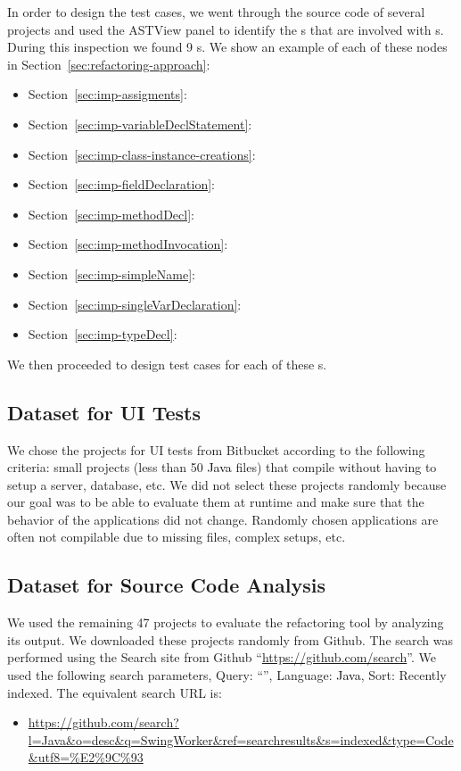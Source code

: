 \documentclass[type=bsc,accentcolor=tud9c]{tudthesis}
\newcommand{\framework}[1]{\textcolor{black}{#1}}
\begin{document}
In order to design the test cases, we went through the source code of several projects and used the ASTView panel to identify the s that are involved with s. During this inspection we found 9 s. We show an example of each of these nodes in Section~\ref{sec:refactoring-approach}:
\begin{itemize}
	\item Section~\ref{sec:imp-assigments}: 
	\item Section~\ref{sec:imp-variableDeclStatement}: 
	\item Section~\ref{sec:imp-class-instance-creations}: 
	\item Section~\ref{sec:imp-fieldDeclaration}: 
	\item Section~\ref{sec:imp-methodDecl}: 
	\item Section~\ref{sec:imp-methodInvocation}: 
	\item Section~\ref{sec:imp-simpleName}: 
	\item Section~\ref{sec:imp-singleVarDeclaration}: 
	\item Section~\ref{sec:imp-typeDecl}: 
\end{itemize}

We then proceeded to design test cases for each of these s.

\subsection{Dataset for UI Tests}
\label{sec:eval-ui-test}
We chose the projects for UI tests from Bitbucket according to the following criteria: small projects (less than 50 \framework{Java} files) that compile without having to setup a server, database, etc. We did not select these projects randomly because our goal was to be able to evaluate them at runtime and make sure that the behavior of the applications did not change. Randomly chosen applications are often not compilable due to missing files, complex setups, etc.

\subsection{Dataset for Source Code Analysis}
\label{sec:eval-src-analysis}
We used the remaining 47 projects to evaluate the refactoring tool by analyzing its output. We downloaded these projects randomly from Github. The search was performed using the Search site from Github ``\url{https://github.com/search}''. We used the following search parameters, Query: ``'', Language: \framework{Java}, Sort: Recently indexed. The equivalent search URL is: 
\begin{itemize}
	\item {\footnotesize \url{https://github.com/search?l=Java&o=desc&q=SwingWorker&ref=searchresults&s=indexed&type=Code&utf8=\%E2\%9C\%93}}
\end{itemize}
\end{document}
